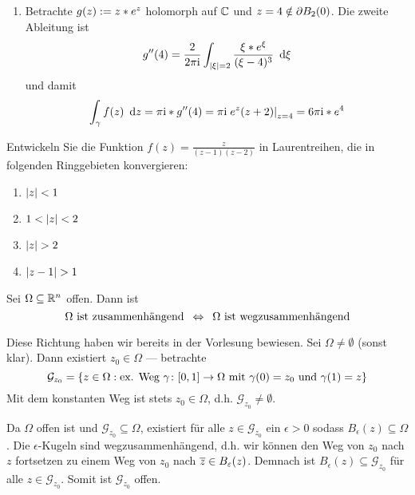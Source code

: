 \begin{exercisePage}
\begin{enumerate}[label=(zu \alph*), leftmargin=*]
		\item Betrachte $g(z) \mathrel{:=} z * e^z$ holomorph auf $\mathbb{C}$ und $z = 4 \notin \partial B_2(0)$. Die zweite Ableitung ist
		\begin{equation*}
			g''(4) = \frac{2}{2 \pi \mathrm{i}} \int_{\left| \xi \right| = 2} \frac{\xi * e^\xi}{(\xi - 4)^3} \enskip \mathrm{d}\xi 
		\end{equation*}
		und damit
		\begin{equation*}
			\int_\gamma f(z) \enskip \mathrm{d}z = \pi \mathrm{i} * g''(4) = \pi \mathrm{i} \left. e^z (z+2) \right\vert_{z = 4} = 6 \pi \mathrm{i} * e^4
		\end{equation*}
	\end{enumerate}

	\begin{task}
		Entwickeln Sie die Funktion $\displaystyle f(z) = \frac{z}{(z-1)(z-2)}$ in Laurentreihen, die in folgenden Ringgebieten konvergieren:
		\begin{enumerate}
			\item $\left| z \right| < 1$
			\item $1 < \left| z \right| < 2$
			\item $\left| z \right| > 2$
			\item $\left| z-1 \right| > 1$
		\end{enumerate}
	\end{task}

	\begin{task}
		Sei $\Omega \subseteq \mathbb{R}^n$ offen. Dann ist
		\begin{equation*}
			\Omega \text{ ist zusammenhängend} \enskip \Leftrightarrow \enskip \Omega \text{ ist wegzusammenhängend}
		\end{equation*}
	\end{task}

	\begin{equivalence}
		\rueckrichtung Diese Richtung haben wir bereits in der Vorlesung bewiesen.
		\hinrichtung Sei $\Omega \neq \emptyset$ (sonst klar). Dann existiert $z_0 \in \Omega$ --- betrachte 
		\begin{equation*}
			\mathcal{G}_{z_0} = \left\{ z \in \Omega : \text{ex. Weg } \gamma \colon [0,1] \to \Omega \text{ mit } \gamma(0) = z_0 \text{ und } \gamma(1) = z \right\}
		\end{equation*}
		Mit dem konstanten Weg ist stets $z_0 \in \Omega$, d.h. $\mathcal{G}_{z_0} \neq \emptyset$.
		
		Da $\Omega$ offen ist und $\mathcal{G}_{z_0} \subseteq \Omega$, existiert für alle $z \in \mathcal{G}_{z_0}$ ein $\epsilon > 0$ sodass $B_\epsilon(z) \subseteq \Omega$. Die $\epsilon$-Kugeln sind wegzusammenhängend, d.h. wir können den Weg von $z_0$ nach $z$ fortsetzen zu einem Weg von $z_0$ nach $\overline{z} \in B_\varepsilon(z)$. Demnach ist $B_\epsilon(z) \subseteq \mathcal{G}_{z_0}$ für alle $z \in \mathcal{G}_{z_0}$. Somit ist $\mathcal{G}_{z_0}$ offen. 
		

\end{equivalence}
\end{exercisePage}
